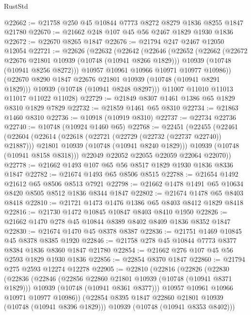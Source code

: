 \begin{lexlean}{RustStd}
\begin{coremodule}
@22662 := @21758 @250 @45 @10844 @7773 @8272 @8279 @1836 @8255 @1847 @21780
@22670 := @21662 @248 @107 @45 @56 @2467 @1829 @1930 @1836
@22672 := @22670 @8265 @1847
@22676 := @21794 @247 @2467 @12050 @12054
@22721 := @22626
    (@22632
      (@22642
        (@22646
          (@22652
            (@22662
              (@22672 @22676 @21801 @10939 (@10748 (@10941 @8266 @1829)))
              @10939
              (@10748 (@10941 @8256 @8272)))
            @10957
            @10961
            @10966
            @10971
            @10977
            @10986))
        (@22670 @8290 @1847 @22676 @21801 @10939 (@10748 (@10941 @8291 @1829)))
        @10939
        (@10748 (@10941 @8248 @8297)))
      @11007
      @11010
      @11013
      @11017
      @11022
      @11028)
@22729 := @21849 @8307 @1461 @1386 @65 @1829 @8310 @1829 @7829
@22732 := @21859 @1461 @65 @8310
@22734 := @21863 @1460 @8310
@22736 := @10918 (@10919 @8310)
@22737 := @22734 @22736
@22740 := @10748 (@10924 @1460 @65)
@22768 := @22451
    (@22455
      (@22461
        (@22604
          (@22614
            (@22618 (@22721 (@22729 (@22732 (@22737 @22740)) @21887)))
            @21801
            @10939
            (@10748 (@10941 @8240 @1829)))
          @10939
          (@10748 (@10941 @8158 @8318)))
        @22049
        @22052
        @22055
        @22059
        @22064
        @22070))
@22778 := @21662 @1493 @107 @65 @56 @8517 @1829 @1930 @1836 @8336 @1847
@22782 := @21674 @1493 @65 @8506 @8515
@22788 := @21654 @1492 @21612 @65 @8506 @8513 @7921
@22798 := @21662 @1478 @1491 @65 @10634 @8420 @8505 @8512 @1836 @8344 @1847
@22802 := @21674 @1478 @65 @8403 @8418
@22810 := @21721 @1473 @1476 @1386 @65 @8403 @8412 @1829 @8418
@22816 := @21730 @1472 @10845 @10847 @8403 @8410 @1950
@22826 := @21662 @1470 @278 @45 @10844 @8389 @8402 @8409 @1836 @8352 @1847
@22830 := @21674 @1470 @45 @8378 @8387
@22836 := @21751 @1469 @10845 @45 @8378 @8385 @1920
@22846 := @21758 @278 @45 @10844 @7773 @8377 @8384 @1836 @8360 @1847 @21780
@22854 := @21662 @276 @107 @45 @56 @2593 @1829 @1930 @1836
@22856 := @22854 @8370 @1847
@22860 := @21794 @275 @2593 @12274 @12278
@22905 := @22810
    (@22816
      (@22826
        (@22830
          (@22836
            (@22846
              (@22856 @22860 @21801 @10939 (@10748 (@10941 @8371 @1829)))
              @10939
              (@10748 (@10941 @8361 @8377)))
            @10957
            @10961
            @10966
            @10971
            @10977
            @10986))
        (@22854 @8395 @1847 @22860 @21801 @10939 (@10748 (@10941 @8396 @1829)))
        @10939
        (@10748 (@10941 @8353 @8402)))

\end{coremodule}
\end{lexlean}
